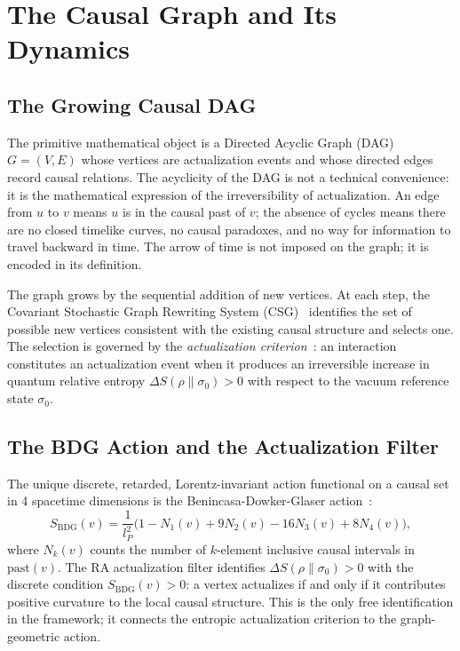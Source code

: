\documentclass[11pt,a4paper]{article}
\newcommand{\SBDG}{S_{\mathrm{BDG}}}
\begin{document}
\section{The Causal Graph and Its Dynamics}
\label{sec:graph}

\subsection{The Growing Causal DAG}

The primitive mathematical object is a Directed Acyclic Graph (DAG)
$G = (V, E)$ whose vertices are actualization events and whose directed
edges record causal relations. The acyclicity of the DAG is not a technical
convenience: it is the mathematical expression of the irreversibility of
actualization. An edge from $u$ to $v$ means $u$ is in the causal past of
$v$; the absence of cycles means there are no closed timelike curves, no
causal paradoxes, and no way for information to travel backward in time.
The arrow of time is not imposed on the graph; it is encoded in its
definition.

The graph grows by the sequential addition of new vertices. At each step,
the Covariant Stochastic Graph Rewriting System (CSG)~\citep{Sandeman2026RAEB}
identifies the set of possible new vertices consistent with the existing
causal structure and selects one. The selection is governed by the
\emph{actualization criterion}~\citep{Sandeman2026RAQM}: an interaction
constitutes an actualization event when it produces an irreversible increase
in quantum relative entropy $\Delta S(\rho\|\sigma_0) > 0$ with respect to
the vacuum reference state $\sigma_0$.

\subsection{The BDG Action and the Actualization Filter}

The unique discrete, retarded, Lorentz-invariant action functional on a
causal set in 4 spacetime dimensions is the Benincasa-Dowker-Glaser
action~\citep{Benincasa2010}:
\begin{equation}
  \SBDG(v) = \frac{1}{l_P^2}\bigl(1 - N_1(v) + 9N_2(v) - 16N_3(v)
  + 8N_4(v)\bigr),
  \label{eq:BDG}
\end{equation}
where $N_k(v)$ counts the number of $k$-element inclusive causal intervals
in $\mathrm{past}(v)$. The RA actualization filter identifies
$\Delta S(\rho\|\sigma_0) > 0$ with the discrete condition $\SBDG(v) > 0$:
a vertex actualizes if and only if it contributes positive curvature to
the local causal structure. This is the only free identification in the
framework; it connects the entropic actualization criterion to the
graph-geometric action.
\end{document}
